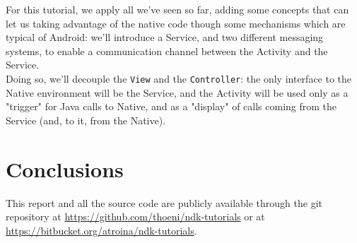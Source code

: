 \documentclass[a4paper,10pt]{article}
\newcommand{\keyword}[1]{\texttt{#1}}
\begin{document}
\begin{multicols}{2}
For this tutorial, we apply all we've seen so far, adding some concepts that can
let us taking advantage of the native code though some mechanisms which are
typical of Android: we'll introduce a Service, and two different messaging
systems, to enable a communication channel between the Activity and the Service.
\\Doing so, we'll decouple the \keyword{View} and the \keyword{Controller}: the
only interface to the Native environment will be the Service, and the Activity
will be used only as a "trigger" for Java calls to Native, and as a "display" of calls coming from the Service (and, to it, from the Native).


\section{Conclusions}

This report and all the source code are publicly available through the git
repository at \url{https://github.com/thoeni/ndk-tutorials} or at \url{https://bitbucket.org/atroina/ndk-tutorials}.

\nocite{liang1999jni}
\nocite{marakanajni}
\nocite{learningandroid}
\nocite{programmingandroid}




\end{multicols}
\end{document}
